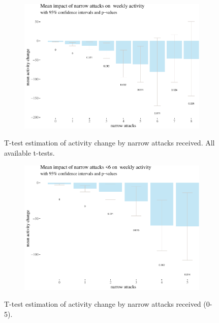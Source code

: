 \documentclass[10pt,]{scrartcl}
\begin{document}
\begin{figure}[h!]
\begin{subfigure}[t]{0.95\textwidth}

\begin{center}\includegraphics[width=1\linewidth]{redditAnalysisWalkthrough_files/figure-latex/unnamed-chunk-28-1} \end{center}
\end{subfigure}
\caption{T-test estimation of activity change by narrow attacks received. All available t-tests.}
\label{fig:highbar}
\end{figure}

\begin{figure}[h!]
\begin{subfigure}[t]{0.95\textwidth}

\begin{center}\includegraphics[width=1\linewidth]{redditAnalysisWalkthrough_files/figure-latex/unnamed-chunk-29-1} \end{center}
\end{subfigure}
\caption{T-test estimation of activity change by narrow attacks received (0-5).}
\label{fig:highbar6}
\end{figure}
\end{document}

